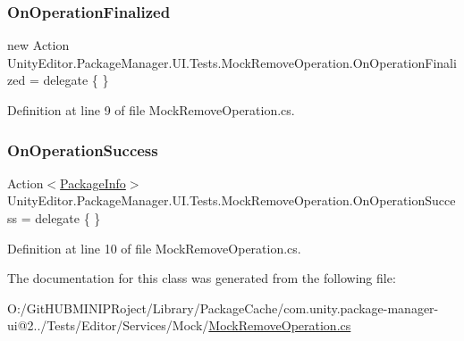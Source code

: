 \subsubsection{\texorpdfstring{OnOperationFinalized}{OnOperationFinalized}}
{\footnotesize\ttfamily new Action Unity\+Editor.\+Package\+Manager.\+U\+I.\+Tests.\+Mock\+Remove\+Operation.\+On\+Operation\+Finalized = delegate \{ \}}



Definition at line 9 of file Mock\+Remove\+Operation.\+cs.

\mbox{\label{class_unity_editor_1_1_package_manager_1_1_u_i_1_1_tests_1_1_mock_remove_operation_a456bc48236cc795d9767bb2ee52191ae}} 
\subsubsection{\texorpdfstring{OnOperationSuccess}{OnOperationSuccess}}
{\footnotesize\ttfamily Action$<$\mbox{\hyperlink{class_unity_editor_1_1_package_manager_1_1_u_i_1_1_package_info}{Package\+Info}}$>$ Unity\+Editor.\+Package\+Manager.\+U\+I.\+Tests.\+Mock\+Remove\+Operation.\+On\+Operation\+Success = delegate \{ \}}



Definition at line 10 of file Mock\+Remove\+Operation.\+cs.



The documentation for this class was generated from the following file\+:\begin{DoxyCompactItemize}
\item 
O\+:/\+Git\+H\+U\+B\+M\+I\+N\+I\+P\+Roject/\+Library/\+Package\+Cache/com.\+unity.\+package-\/manager-\/ui@2../\+Tests/\+Editor/\+Services/\+Mock/\mbox{\hyperlink{_mock_remove_operation_8cs}{Mock\+Remove\+Operation.\+cs}}\end{DoxyCompactItemize}
